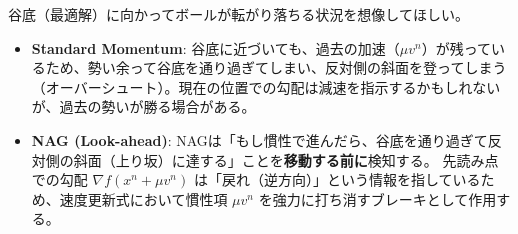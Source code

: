 \documentclass[dvipdfmx,a4paper,11pt]{jsarticle}
\begin{document}
谷底（最適解）に向かってボールが転がり落ちる状況を想像してほしい。
\begin{itemize}
    \item \textbf{Standard Momentum}: 谷底に近づいても、過去の加速（$\mu v^n$）が残っているため、勢い余って谷底を通り過ぎてしまい、反対側の斜面を登ってしまう（オーバーシュート）。現在の位置での勾配は減速を指示するかもしれないが、過去の勢いが勝る場合がある。
    \item \textbf{NAG (Look-ahead)}: NAGは「もし慣性で進んだら、谷底を通り過ぎて反対側の斜面（上り坂）に達する」ことを\textbf{移動する前に}検知する\footnotemark[8]。
    先読み点での勾配 $\nabla f(x^n + \mu v^n)$ は「戻れ（逆方向）」という情報を指しているため、速度更新式において慣性項 $\mu v^n$ を強力に打ち消すブレーキとして作用する。
\end{itemize}




\end{document}
